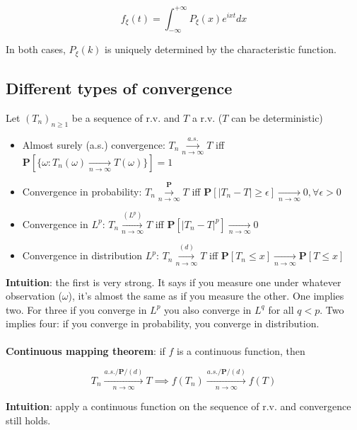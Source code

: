 \documentclass{article}
\begin{document}
$$
f_{\xi}(t) = \int_{-\infty}^{+\infty}{ P_{\xi}(x) e^{ixt} dx}
$$

In both cases, $P_{\xi}(k)$ is uniquely determined by the characteristic function.

\subsection{Different types of convergence}

Let $(T_n)_{n \geq 1}$ be a sequence of r.v. and $T$ a r.v. ($T$ can be deterministic)

\begin{itemize}
  \item Almost surely (a.s.) convergence: $T_n \overset{a.s.}{\underset{n \rightarrow \infty}{\longrightarrow}} T$ iff $\mathbf{P}[\{ \omega : T_n(\omega) \underset{n \rightarrow \infty}{\longrightarrow} T(\omega)\}] = 1$
  \item Convergence in probability: $T_n \overset{\mathbf{P}}{\underset{n \rightarrow \infty}{\longrightarrow}} T$ iff $\mathbf{P}[|T_n - T| \geq \epsilon] \underset{n \rightarrow \infty}{\longrightarrow} 0, \forall \epsilon > 0$
  \item Convergence in $L^p$: $T_n \overset{(L^p)}{\underset{n \rightarrow \infty}{\longrightarrow}} T$ iff $\mathbf{P}[|T_n - T|^p] \underset{n \rightarrow \infty}{\longrightarrow} 0$
  \item Convergence in distribution $L^p$: $T_n \overset{(d)}{\underset{n \rightarrow \infty}{\longrightarrow}} T$ iff $\mathbf{P}[T_n \leq x] \underset{n \rightarrow \infty}{\longrightarrow} \mathbf{P}[T \leq x]$
\end{itemize}

\textbf{Intuition}: the first is very strong. It says if you measure one under whatever observation ($\omega$), it's almost the same as if you measure the other.
One implies two. For three if you converge in $L^p$ you also converge in $L^q$ for all $q < p$.
Two implies four: if you converge in probability, you converge in distribution.
\\
\\
\textbf{Continuous mapping theorem}: if $f$ is a continuous function, then

$$
T_n \overset{a.s. / \mathbf{P} / (d)}{\underset{n \rightarrow \infty}{\longrightarrow}} T \implies f(T_n) \overset{a.s. / \mathbf{P} / (d)}{\underset{n \rightarrow \infty}{\longrightarrow}} f(T)
$$

\textbf{Intuition}: apply a continuous function on the sequence of r.v. and convergence still holds.
\end{document}
